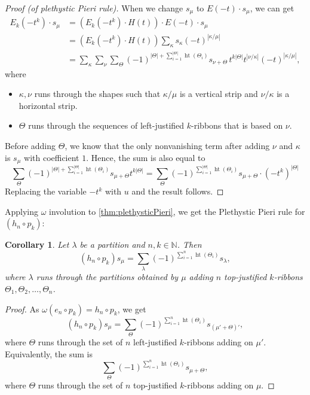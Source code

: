 \documentclass[pdflatex,sn-mathphys-num]{sn-jnl}%
\theoremstyle{thmstyleone}%
\newtheorem{corollary}[theorem]{Corollary}
\theoremstyle{thmstyletwo}%
\theoremstyle{thmstylethree}%
\numberwithin{equation}{section}
\newcommand{\N}{\mathbb{N}}
\DeclareMathOperator{\htt}{ht}
\begin{document}
\begin{proof}[Proof (of plethystic Pieri rule)]
            When we change $s_\mu$ to $E(-t)\cdot s_\mu$, we can get
            \begin{align*}
                E_k(-t^k) \cdot s_\mu&=(E_k(-t^k)\cdot H(t))\cdot E(-t)\cdot s_\mu\\
                &=(E_k(-t^k)\cdot H(t))\sum_{\kappa}s_\kappa(-t)^{|\kappa/\mu|}\\
                &=
                \sum_{\kappa}\sum_{\nu}\sum_{\Theta} (-1)^{|\Theta|+\sum_{i=1}^{|\Theta|}\htt(\Theta_i)}s_{\nu+\Theta}\, t^{k|\Theta|} t^{|\nu/\kappa|}(-t)^{|\kappa/\mu|},
                \end{align*}
            where 
            \begin{itemize}
                \item $\kappa,\nu$ runs through the shapes such that $\kappa/\mu$ is a vertical strip and $\nu/\kappa$ is a horizontal strip.
                \item $\Theta$ runs through the sequences of left-justified $k$-ribbons that is based on $\nu$.
            \end{itemize}
              
            Before adding $\Theta$, we know that the only nonvanishing term after adding $\nu$ and $\kappa$ is $s_\mu$ with coefficient $1$. Hence, the sum is also equal to
              \[\sum_{\Theta} (-1)^{|\Theta|+\sum_{i=1}^{|\Theta|}\htt(\Theta_i)}s_{\mu+\Theta} t^{k|\Theta|}=\sum_{\Theta} (-1)^{\sum_{i=1}^{|\Theta|}\htt(\Theta_i)}s_{\mu+\Theta}\cdot (-t^k)^{|\Theta|}
            \]
            Replacing the variable $-t^k$ with $u$ and the result follows.
        \end{proof}

        Applying $\omega$ involution to \cref{thm:plethysticPieri}, we get the Plethystic Pieri rule for $(h_n\circ p_k)$:
        \begin{corollary}
            Let $\lambda$ be a partition and $n,k\in \N$. Then
            \[(h_n\circ p_k)s_\mu = \sum_{\lambda} (-1)^{\sum_{i=1}^n\htt(\Theta_i)}s_\lambda,\]
            where $\lambda$ runs through the partitions obtained by $\mu$ adding $n$ top-justified $k$-ribbons $\Theta_1,\Theta_2,\dotsc,\Theta_n$.
        \end{corollary}
        \begin{proof}
            As $\omega(e_n\circ p_k)=h_n\circ p_k$, we get 
            \[(h_n\circ p_k) s_\mu= \sum_{\Theta} (-1)^{\sum_{i=1}^n\htt(\Theta_i)}s_{(\mu'+\Theta)'},\]
            where $\Theta$ runs through the set of $n$ left-justified $k$-ribbons adding on $\mu'$. Equivalently, the sum is
            \[\sum_{\Theta} (-1)^{\sum_{i=1}^n\htt(\Theta_i)}s_{\mu+\Theta},\]
            where $\Theta$ runs through the set of $n$ top-justified $k$-ribbons adding on $\mu$. 
        \end{proof}
\end{document}
